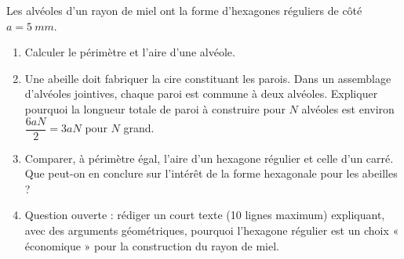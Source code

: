 \documentclass[11pt]{article}
\begin{document}
\begin{exercice}
Les alvéoles d'un rayon de miel ont la forme d'hexagones réguliers de côté $a = \SI{5}{mm}$.
\begin{enumerate}
\item Calculer le périmètre et l'aire d'une alvéole.
\item Une abeille doit fabriquer la cire constituant les parois. Dans un assemblage d'alvéoles jointives, chaque paroi est commune à deux alvéoles. Expliquer pourquoi la longueur totale de paroi à construire pour $N$ alvéoles est environ $\dfrac{6aN}{2} = 3aN$ pour $N$ grand.
\item Comparer, à périmètre égal, l'aire d'un hexagone régulier et celle d'un carré. Que peut-on en conclure sur l'intérêt de la forme hexagonale pour les abeilles ?
\item Question ouverte : rédiger un court texte (10 lignes maximum) expliquant, avec des arguments géométriques, pourquoi l'hexagone régulier est un choix « économique » pour la construction du rayon de miel.
\end{enumerate}
\end{exercice}
\end{document}
